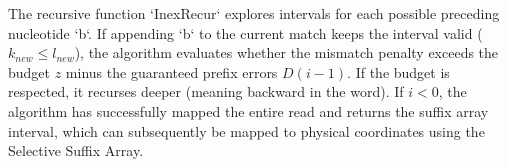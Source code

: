 \documentclass{article}
\begin{document}
The recursive function `InexRecur` explores intervals for each possible preceding nucleotide `b`. If appending `b` to the current match keeps the interval valid ($k_{new} \leq l_{new}$), the algorithm evaluates whether the mismatch penalty exceeds the budget $z$ minus the guaranteed prefix errors $D(i-1)$. If the budget is respected, it recurses deeper (meaning backward in the word). If $i < 0$, the algorithm has successfully mapped the entire read and returns the suffix array interval, which can subsequently be mapped to physical coordinates using the Selective Suffix Array.
\end{document}
